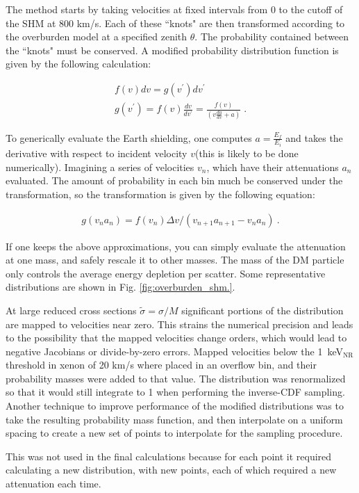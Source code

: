 The method starts by taking velocities at fixed intervals from 0 to the cutoff of the SHM at 800 km/s. 
Each of these ``knots" are then transformed according to the overburden model at a specified zenith $\theta$.
The probability contained between the ``knots" must be conserved.
A modified probability distribution function is given by the following calculation: 

\begin{align}
    f(v)dv = g(v^\prime) dv^\prime \\
    g(v^\prime) = f(v) \frac{dv}{dv^\prime} =\frac { f(v) }{(v \frac{da}{dv} + a)}\;.
\end{align}

To generically evaluate the Earth shielding, one computes $a= \frac{E_f}{E_i}$ and takes the derivative with respect to incident velocity $v$(this is likely to be done numerically). 
Imagining a series of velocities $v_n$, which have their attenuations   $a_n$ evaluated.
The amount of probability in each bin much be conserved under the transformation, so the transformation is given by the following equation:

\begin{align}
    g(v_n a_n) = f(v_n) \Delta v / (v_{n+1}a_{n+1} - v_n a_n)~.
\end{align}

If one keeps the above approximations, you can simply evaluate the attenuation at one mass, and safely rescale it to other masses.
The mass of the DM particle only controls the average energy depletion per scatter.
Some representative distributions are shown in Fig. \ref{fig:overburden_shm.}.

At large reduced cross sections $\tilde \sigma = \sigma / M$ significant portions of the distribution are mapped to velocities near zero.
This strains the numerical precision and leads to the possibility that the mapped velocities change orders, which would lead to negative Jacobians or divide-by-zero errors.
Mapped velocities below the 1~keV$_{\mathrm{NR}}$ threshold in xenon of 20 km/s where placed in an overflow bin, and their probability masses were added to that value.
The distribution was renormalized so that it would still integrate to 1 when performing the inverse-CDF sampling.
Another technique to improve performance of the modified distributions was to take the resulting probability mass function, and then interpolate on a uniform spacing to create a new set of points to interpolate for the sampling procedure.

This was not used in the final calculations because for each point it required calculating a new distribution, with new points, each of which required a new attenuation each time.

